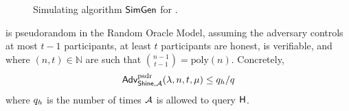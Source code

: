 \begin{figure}[t]
  \centering
	\begin{pchstack}[boxed]
	\end{pchstack}
\caption{Simulating algorithm $\mathsf{SimGen}$ for \DVRFOne.}
\label{fig:simeval-shine}
\end{figure}
%

\begin{theorem} \label{thm:dcvrf-pseudo}
\DVRFOne is pseudorandom in the Random Oracle Model,
assuming the adversary controls at most $t-1$ participants,
at least $t$ participants are honest,
\DVRFOne is verifiable,
and where $(n, t) \in \mathbb{N}$  are such that ${n-1\choose t-1} = \text{poly}(n)$.
%
Concretely,
  \begin{equation} \label{eq:thm-pseudo-shine}
  \textsf{\upshape Adv}^{\textrm{\upshape psdr}}_{\mathsf{Shine},\mathcal{A}}(\lambda, n, t, \mu) \leq q_h/q
\end{equation}
where $q_h$ is the number of times $\mathcal{A}$ is allowed to query $\mathsf{H}$.
\end{theorem}

